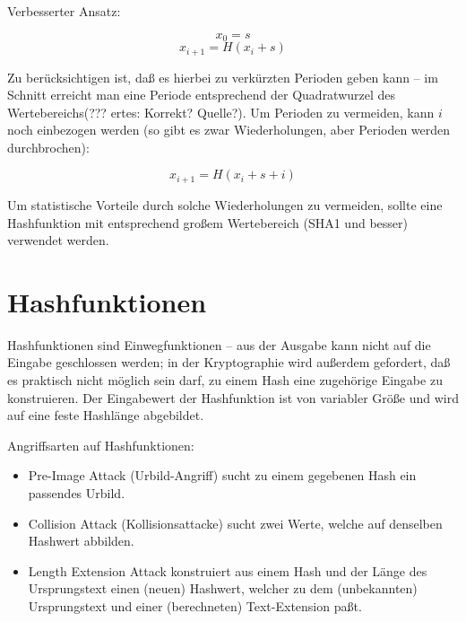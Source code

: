 Verbesserter Ansatz:

$$x_0 = s$$
$$x_{i+1} = H(x_i + s)$$

Zu berücksichtigen ist, daß es hierbei zu verkürzten Perioden geben kann -- im Schnitt erreicht man eine Periode entsprechend der Quadratwurzel des Wertebereichs(??? ertes: Korrekt? Quelle?). Um Perioden zu vermeiden, kann $i$ noch einbezogen werden (so gibt es zwar Wiederholungen, aber Perioden werden durchbrochen):

$$x_{i+1} = H(x_i + s + i)$$

Um statistische Vorteile durch solche Wiederholungen zu vermeiden, sollte eine Hashfunktion mit entsprechend großem Wertebereich (SHA1 und besser) verwendet werden.


\chapter{Hashfunktionen}

Hashfunktionen sind Einwegfunktionen -- aus der Ausgabe kann nicht auf die Eingabe geschlossen werden; in der Kryptographie wird außerdem gefordert, daß es praktisch nicht möglich sein darf, zu einem Hash eine zugehörige Eingabe zu konstruieren. Der Eingabewert der Hashfunktion ist von variabler Größe und wird auf eine feste Hashlänge abgebildet.

Angriffsarten auf Hashfunktionen:
\begin{itemize}
\item{Pre-Image Attack (Urbild-Angriff)} sucht zu einem gegebenen Hash ein passendes Urbild.
\item{Collision Attack (Kollisionsattacke)} sucht zwei Werte, welche auf denselben Hashwert abbilden.
\item{Length Extension Attack} konstruiert aus einem Hash und der Länge des Ursprungstext einen (neuen) Hashwert, welcher zu dem (unbekannten) Ursprungstext und einer (berechneten) Text-Extension paßt.
\end{itemize}

